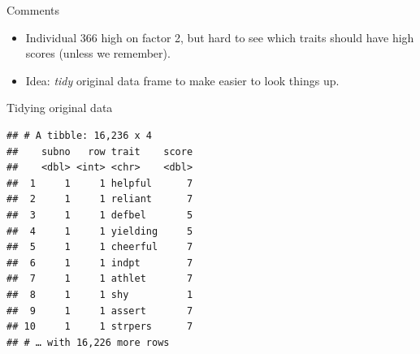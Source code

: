 \documentclass[ignorenonframetext,]{beamer}
\newenvironment{Shaded}{\begin{snugshade}}{\end{snugshade}}
\newcommand{\DataTypeTok}[1]{\textcolor[rgb]{0.13,0.29,0.53}{#1}}
\newcommand{\KeywordTok}[1]{\textcolor[rgb]{0.13,0.29,0.53}{\textbf{#1}}}
\newcommand{\NormalTok}[1]{#1}
\newcommand{\OperatorTok}[1]{\textcolor[rgb]{0.81,0.36,0.00}{\textbf{#1}}}
\newcommand{\StringTok}[1]{\textcolor[rgb]{0.31,0.60,0.02}{#1}}
\begin{document}
\begin{frame}{Comments}
\protect\hypertarget{comments-43}{}

\begin{itemize}
\item
  Individual 366 high on factor 2, but hard to see which traits should
  have high scores (unless we remember).
\item
  Idea: \emph{tidy} original data frame to make easier to look things
  up.
\end{itemize}

\end{frame}

\begin{frame}[fragile]{Tidying original data}
\protect\hypertarget{tidying-original-data}{}

\scriptsize

\begin{Shaded}
\end{Shaded}

\begin{verbatim}
## # A tibble: 16,236 x 4
##    subno   row trait    score
##    <dbl> <int> <chr>    <dbl>
##  1     1     1 helpful      7
##  2     1     1 reliant      7
##  3     1     1 defbel       5
##  4     1     1 yielding     5
##  5     1     1 cheerful     7
##  6     1     1 indpt        7
##  7     1     1 athlet       7
##  8     1     1 shy          1
##  9     1     1 assert       7
## 10     1     1 strpers      7
## # … with 16,226 more rows
\end{verbatim}

\normalsize

\end{frame}
\end{document}
